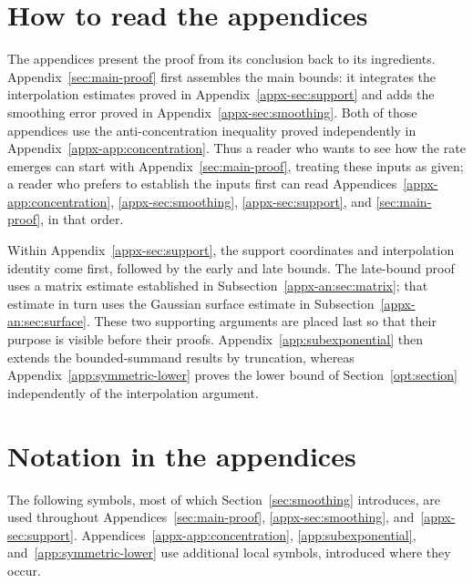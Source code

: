 \documentclass[11pt,letterpaper]{article}
\theoremstyle{remark}
\begin{document}
\section*{How to read the appendices}
The appendices present the proof from its conclusion back to its
ingredients. Appendix~\ref{sec:main-proof} first assembles the main
bounds: it integrates the interpolation estimates proved in
Appendix~\ref{appx-sec:support} and adds the smoothing error proved in
Appendix~\ref{appx-sec:smoothing}. Both of those appendices use the
anti-concentration inequality proved independently in
Appendix~\ref{appx-app:concentration}. Thus a reader who wants to see
how the rate emerges can start with Appendix~\ref{sec:main-proof},
treating these inputs as given; a reader who prefers to establish the
inputs first can read Appendices~\ref{appx-app:concentration},
\ref{appx-sec:smoothing}, \ref{appx-sec:support}, and
\ref{sec:main-proof}, in that order.

Within Appendix~\ref{appx-sec:support}, the support coordinates and
interpolation identity come first, followed by the early and late
bounds. The late-bound proof uses a matrix estimate established in
Subsection~\ref{appx-an:sec:matrix}; that estimate in turn uses the
Gaussian surface estimate in Subsection~\ref{appx-an:sec:surface}.
These two supporting arguments are placed last so that their purpose
is visible before their proofs. Appendix~\ref{app:subexponential}
then extends the bounded-summand results by truncation, whereas
Appendix~\ref{app:symmetric-lower} proves the lower bound of
Section~\ref{opt:section} independently of the interpolation argument.

\section*{Notation in the appendices}
The following symbols, most of which Section~\ref{sec:smoothing}
introduces, are used throughout
Appendices~\ref{sec:main-proof}, \ref{appx-sec:smoothing},
and~\ref{appx-sec:support}.
Appendices~\ref{appx-app:concentration}, \ref{app:subexponential},
and~\ref{app:symmetric-lower} use additional local symbols, introduced
where they occur.
\end{document}
